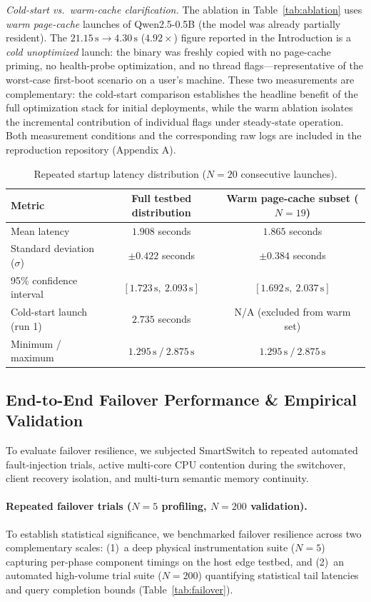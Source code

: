 \documentclass[11pt,a4paper]{article}
\newcommand{\su}{\,\mathrm{s}}
\begin{document}
\textit{Cold-start vs.\ warm-cache clarification.} The ablation in Table~\ref{tab:ablation} uses \emph{warm page-cache} launches of Qwen2.5-0.5B (the model was already partially resident). The $21.15\su \rightarrow 4.30\su$ ($4.92\times$) figure reported in the Introduction is a \emph{cold unoptimized} launch: the binary was freshly copied with no page-cache priming, no health-probe optimization, and no thread flags---representative of the worst-case first-boot scenario on a user's machine. These two measurements are complementary: the cold-start comparison establishes the headline benefit of the full optimization stack for initial deployments, while the warm ablation isolates the incremental contribution of individual flags under steady-state operation. Both measurement conditions and the corresponding raw logs are included in the reproduction repository (Appendix A).

\begin{table}[h]
\centering
\caption{Repeated startup latency distribution ($N=20$ consecutive launches).}\label{tab:startup}
\small
\begin{tabularx}{\linewidth}{@{}LCC@{}}
\toprule
\textbf{Metric} & \textbf{Full testbed distribution} & \textbf{Warm page-cache subset ($N=19$)} \\
\midrule
Mean latency & $1.908$ seconds & $\mathbf{1.865}$ seconds \\
Standard deviation ($\sigma$) & $\pm0.422$ seconds & $\pm0.384$ seconds \\
95\% confidence interval & $[1.723\su,\ 2.093\su]$ & $\mathbf{[1.692\su,\ 2.037\su]}$ \\
Cold-start launch (run 1) & $2.735$ seconds & N/A (excluded from warm set) \\
Minimum / maximum & $1.295\su\ /\ 2.875\su$ & $1.295\su\ /\ 2.875\su$ \\
\bottomrule
\end{tabularx}
\end{table}

\subsection{End-to-End Failover Performance \& Empirical Validation}
To evaluate failover resilience, we subjected SmartSwitch to repeated automated fault-injection trials, active multi-core CPU contention during the switchover, client recovery isolation, and multi-turn semantic memory continuity.

\paragraph{Repeated failover trials ($N=5$ profiling, $N=200$ validation).}
To establish statistical significance, we benchmarked failover resilience across two complementary scales: (1)~a deep physical instrumentation suite ($N=5$) capturing per-phase component timings on the host edge testbed, and (2)~an automated high-volume trial suite ($N=200$) quantifying statistical tail latencies and query completion bounds (Table~\ref{tab:failover}).
\end{document}
